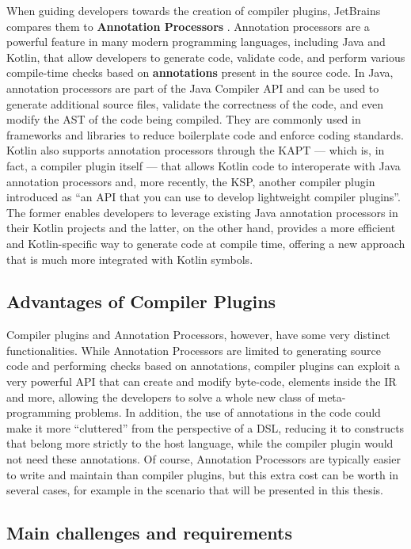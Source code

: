 \documentclass[12pt,a4paper,openright,twoside]{book}
\begin{document}
When guiding developers towards the creation of compiler plugins, JetBrains
compares them to \textbf{Annotation Processors}
\cite{JetBrains:KotlinCompilerPlugin}. Annotation processors are a powerful
feature in many modern programming languages, including Java and Kotlin, that
allow developers to generate code, validate code, and perform various
compile-time checks based on \textbf{annotations} present in the source code.
%
In Java, annotation processors are part of the Java Compiler API and can be used
to generate additional source files, validate the correctness of the code, and
even modify the \ac{AST} of the code being compiled. They are
commonly used in frameworks and libraries to reduce boilerplate code and enforce
coding standards.
%
Kotlin also supports annotation processors through the \ac{KAPT} --- which is, in
fact, a compiler plugin itself --- that allows Kotlin code to interoperate with
Java annotation processors and, more recently, the \ac{KSP}, another compiler
plugin introduced as ``an API that you can use to develop lightweight compiler
plugins''. The former enables developers to leverage existing Java annotation
processors in their Kotlin projects and the latter, on the other hand, provides
a more efficient and Kotlin-specific way to generate code at compile time,
offering a new approach that is much more integrated with Kotlin symbols.

\subsection{Advantages of Compiler Plugins}

Compiler plugins and Annotation Processors, however, have some very distinct
functionalities. While Annotation Processors are limited to generating source
code and performing checks based on annotations, compiler plugins can exploit a
very powerful API that can create and modify byte-code, elements inside the
\ac{IR} and more, allowing the developers to solve a whole new class of
meta-programming problems. In addition, the use of annotations in the code could
make it more ``cluttered'' from the perspective of a \ac{DSL}, reducing it to
constructs that belong more strictly to the host language, while the compiler
plugin would not need these annotations. Of course, Annotation Processors are
typically easier to write and maintain than compiler plugins, but this extra
cost can be worth in several cases, for example in the scenario that will be
presented in this thesis.

\subsection{Main challenges and requirements}
\end{document}
